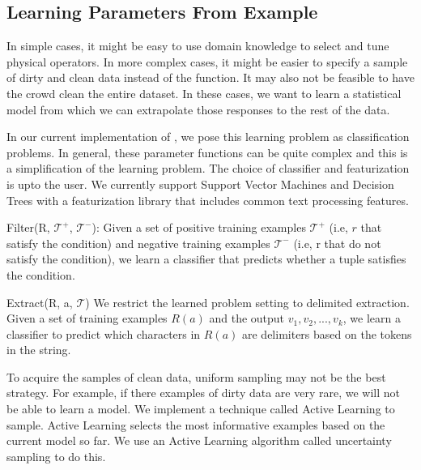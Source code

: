 


\subsection{Learning Parameters From Example}
In simple cases, it might be easy to use domain knowledge to select and tune physical operators. 
In more complex cases, it might be easier to specify a sample of dirty and clean data instead of the function.
It may also not be feasible to have the crowd clean the entire dataset.
In these cases, we want to learn a statistical model from which we can extrapolate those responses to the rest 
of the data.

In our current implementation of \projx, we pose this learning problem as classification problems.
In general, these parameter functions can be quite complex and this is a simplification of the learning problem.
The choice of classifier and featurization is upto the user. 
We currently support Support Vector Machines and Decision Trees with a featurization library that includes common text processing features.

\vspace{0.5em}

\noindent \textsf{Filter(R, $\mathcal{T}^+$, $\mathcal{T}^-$)}: Given a set of positive training examples $\mathcal{T}^+$ (i.e, $r$ that satisfy the condition) and
negative training examples $\mathcal{T}^-$ (i.e, r that do not satisfy the condition), we learn a classifier that predicts whether a tuple satisfies the condition. 

\vspace{0.5em}

\noindent \textsf{Extract(R, a, $\mathcal{T}$)} We restrict the learned problem setting to delimited extraction. Given a set of training examples $R(a)$ and the output $v_1,v_2,...,v_k$, we learn a classifier to predict which characters in $R(a)$ are delimiters based on the tokens in the string.

\vspace{1em}

To acquire the samples of clean data, uniform sampling may not be the best strategy.
For example, if there examples of dirty data are very rare, we will not be able to learn a model.
We implement a technique called Active Learning to sample.
Active Learning selects the most informative examples based on the current model so far.
We use an Active Learning algorithm called uncertainty sampling to do this.




